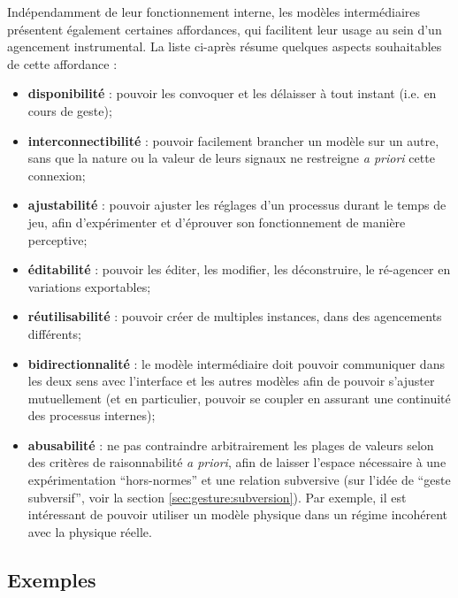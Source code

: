 \noindent Indépendamment de leur fonctionnement interne, les modèles intermédiaires présentent également certaines affordances, qui facilitent leur usage au sein d'un agencement instrumental. La liste ci-après résume quelques aspects souhaitables de cette affordance :
\vspace{-1em}
\begin{itemize}[noitemsep]
	\item \textbf{disponibilité} : pouvoir les convoquer et les délaisser à tout instant (i.e. en cours de geste);
	\item \textbf{interconnectibilité} : pouvoir facilement brancher un modèle sur un autre, sans que la nature ou la valeur de leurs signaux ne restreigne \textit{a priori} cette connexion;
	\item \textbf{ajustabilité} : pouvoir ajuster les réglages d'un processus durant le temps de jeu, afin d'expérimenter et d'éprouver son fonctionnement de manière perceptive;
	\item \textbf{éditabilité} : pouvoir les éditer, les modifier, les déconstruire, le ré-agencer en variations exportables;
	\item \textbf{réutilisabilité} : pouvoir créer de multiples instances, dans des agencements différents;
	\item \textbf{bidirectionnalité} : le modèle intermédiaire doit pouvoir communiquer dans les deux sens avec l'interface et les autres modèles afin de pouvoir s'ajuster mutuellement (et en particulier, pouvoir se coupler en assurant une continuité des processus internes);
	\item \textbf{abusabilité} : ne pas contraindre arbitrairement les plages de valeurs selon des critères de raisonnabilité \textit{a priori}, afin de laisser l'espace nécessaire à une expérimentation ``hors-normes'' et une relation subversive (sur l'idée de ``geste subversif'', voir la section \ref{sec:gesture:subversion}). Par exemple, il est intéressant de pouvoir utiliser un modèle physique dans un régime incohérent avec la physique réelle.
\end{itemize}

\subsection{Exemples}
\label{sec:algorithms:MID:examples}

